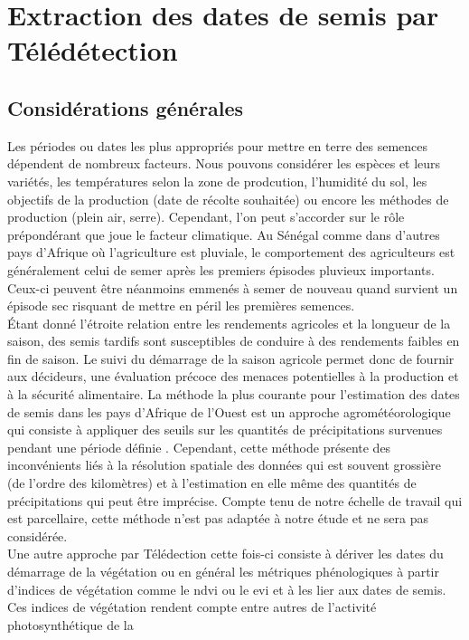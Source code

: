 \section{Extraction des dates de semis par Télédétection}
  
  \subsection{Considérations générales}
  
Les périodes ou dates les plus appropriés pour mettre en terre des semences dépendent de nombreux facteurs.  Nous pouvons considérer les espèces et leurs variétés, les températures 
selon la zone de prodcution, l'humidité du sol, les objectifs de la production (date de récolte souhaitée) ou encore les méthodes de production (plein air, serre). Cependant, l'on peut
s'accorder sur le rôle prépondérant que joue le facteur climatique. Au Sénégal comme dans d'autres pays d'Afrique où l'agriculture est pluviale, le comportement des agriculteurs est
généralement celui de semer après les premiers épisodes pluvieux importants. Ceux-ci peuvent être néanmoins emmenés à semer de nouveau quand survient un épisode sec risquant de
mettre en péril les premières semences.\\ \'Etant donné l'étroite relation entre les rendements agricoles et la longueur de la saison, des semis tardifs sont susceptibles de 
conduire à des rendements faibles en fin de saison. Le suivi du démarrage de la saison agricole permet donc de fournir aux décideurs, une évaluation précoce des menaces potentielles 
à la production et à la sécurité alimentaire. La méthode la plus courante pour l'estimation des dates de semis dans les pays d'Afrique de l'Ouest est un approche agrométéorologique 
qui consiste à appliquer des seuils sur les quantités de précipitations survenues pendant une période définie \citep{Marinho2014}. Cependant, cette méthode présente des inconvénients liés 
à la résolution spatiale des données qui est souvent grossière (de l'ordre des kilomètres) et à l'estimation en elle même des quantités de précipitations qui peut être imprécise. 
Compte tenu de notre échelle de travail qui est parcellaire, cette méthode n'est pas adaptée à notre étude et ne sera pas considérée. \\Une autre approche par Télédection cette fois-ci
consiste à dériver les dates du démarrage de la végétation ou en général les métriques phénologiques à partir d'indices de végétation comme le \acrshort{ndvi} ou le \acrshort{evi} 
et à les lier aux dates de semis. Ces indices de végétation rendent compte entre autres de l’activité photosynthétique de la
